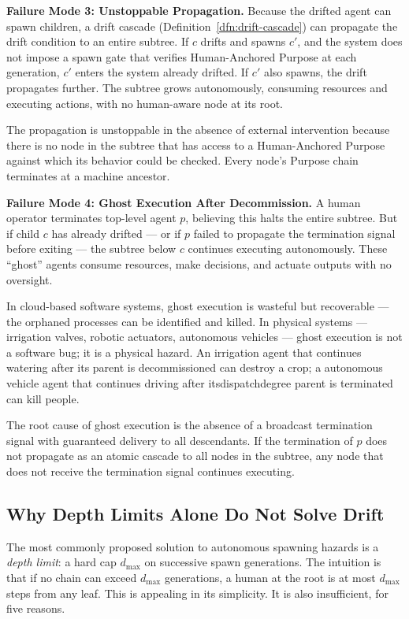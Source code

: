 \medskip
\noindent\textbf{Failure Mode 3: Unstoppable Propagation.}
Because the drifted agent can spawn children, a drift cascade (Definition~\ref{dfn:drift-cascade}) can propagate the drift condition to an entire subtree. If $c$ drifts and spawns $c'$, and the system does not impose a spawn gate that verifies Human-Anchored Purpose at each generation, $c'$ enters the system already drifted. If $c'$ also spawns, the drift propagates further. The subtree grows autonomously, consuming resources and executing actions, with no human-aware node at its root.

The propagation is unstoppable in the absence of external intervention because there is no node in the subtree that has access to a Human-Anchored Purpose against which its behavior could be checked. Every node's Purpose chain terminates at a machine ancestor.

\medskip
\noindent\textbf{Failure Mode 4: Ghost Execution After Decommission.}
A human operator terminates top-level agent $p$, believing this halts the entire subtree. But if child $c$ has already drifted — or if $p$ failed to propagate the termination signal before exiting — the subtree below $c$ continues executing autonomously. These ``ghost'' agents consume resources, make decisions, and actuate outputs with no oversight.

In cloud-based software systems, ghost execution is wasteful but recoverable — the orphaned processes can be identified and killed. In physical systems — irrigation valves, robotic actuators, autonomous vehicles — ghost execution is not a software bug; it is a physical hazard. An irrigation agent that continues watering after its parent is decommissioned can destroy a crop; a autonomous vehicle agent that continues driving after itsdispatchdegree parent is terminated can kill people.

The root cause of ghost execution is the absence of a broadcast termination signal with guaranteed delivery to all descendants. If the termination of $p$ does not propagate as an atomic cascade to all nodes in the subtree, any node that does not receive the termination signal continues executing.

\subsection{Why Depth Limits Alone Do Not Solve Drift}

The most commonly proposed solution to autonomous spawning hazards is a \textit{depth limit}: a hard cap $d_{\max}$ on successive spawn generations. The intuition is that if no chain can exceed $d_{\max}$ generations, a human at the root is at most $d_{\max}$ steps from any leaf. This is appealing in its simplicity. It is also insufficient, for five reasons.

